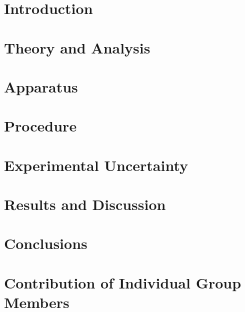 \documentclass[12pt]{article}
\begin{document}



\newpage


\section{Introduction} \label{sec:1}

\clearpage
\section{Theory and Analysis} \label{sec:2}

\clearpage
\section{Apparatus} \label{sec:3}

\clearpage
\section{Procedure} \label{sec:4}

\clearpage
\section{Experimental Uncertainty} \label{sec:5}

\clearpage
\section{Results and Discussion} \label{sec:6}

\clearpage
\section{Conclusions} \label{sec:7}


\clearpage
\label{sec:8}
\begin{thebibliography}{9}

\end{thebibliography}

\section{Contribution of Individual Group Members} \label{sec:9}

\end{document}
